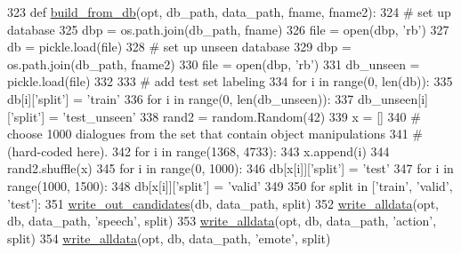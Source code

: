 \begin{DoxyCode}
323 \textcolor{keyword}{def }\hyperlink{namespaceparlai_1_1tasks_1_1light__dialog_1_1builder_a6a049254e487c29d008f875476ffd76f}{build\_from\_db}(opt, db\_path, data\_path, fname, fname2):
324     \textcolor{comment}{# set up database}
325     dbp = os.path.join(db\_path, fname)
326     file = open(dbp, \textcolor{stringliteral}{'rb'})
327     db = pickle.load(file)
328     \textcolor{comment}{# set up unseen database}
329     dbp = os.path.join(db\_path, fname2)
330     file = open(dbp, \textcolor{stringliteral}{'rb'})
331     db\_unseen = pickle.load(file)
332 
333     \textcolor{comment}{# add test set labeling}
334     \textcolor{keywordflow}{for} i \textcolor{keywordflow}{in} range(0, len(db)):
335         db[i][\textcolor{stringliteral}{'split'}] = \textcolor{stringliteral}{'train'}
336     \textcolor{keywordflow}{for} i \textcolor{keywordflow}{in} range(0, len(db\_unseen)):
337         db\_unseen[i][\textcolor{stringliteral}{'split'}] = \textcolor{stringliteral}{'test\_unseen'}
338     rand2 = random.Random(42)
339     x = []
340     \textcolor{comment}{# choose 1000 dialogues from the set that contain object manipulations}
341     \textcolor{comment}{# (hard-coded here).}
342     \textcolor{keywordflow}{for} i \textcolor{keywordflow}{in} range(1368, 4733):
343         x.append(i)
344     rand2.shuffle(x)
345     \textcolor{keywordflow}{for} i \textcolor{keywordflow}{in} range(0, 1000):
346         db[x[i]][\textcolor{stringliteral}{'split'}] = \textcolor{stringliteral}{'test'}
347     \textcolor{keywordflow}{for} i \textcolor{keywordflow}{in} range(1000, 1500):
348         db[x[i]][\textcolor{stringliteral}{'split'}] = \textcolor{stringliteral}{'valid'}
349 
350     \textcolor{keywordflow}{for} split \textcolor{keywordflow}{in} [\textcolor{stringliteral}{'train'}, \textcolor{stringliteral}{'valid'}, \textcolor{stringliteral}{'test'}]:
351         \hyperlink{namespaceparlai_1_1tasks_1_1light__dialog_1_1builder_a25aca9f28e4406290624e1d0c5cce0d6}{write\_out\_candidates}(db, data\_path, split)
352         \hyperlink{namespaceparlai_1_1tasks_1_1light__dialog_1_1builder_aeb144d0ebd2fd1727f73677e36f2c8b5}{write\_alldata}(opt, db, data\_path, \textcolor{stringliteral}{'speech'}, split)
353         \hyperlink{namespaceparlai_1_1tasks_1_1light__dialog_1_1builder_aeb144d0ebd2fd1727f73677e36f2c8b5}{write\_alldata}(opt, db, data\_path, \textcolor{stringliteral}{'action'}, split)
354         \hyperlink{namespaceparlai_1_1tasks_1_1light__dialog_1_1builder_aeb144d0ebd2fd1727f73677e36f2c8b5}{write\_alldata}(opt, db, data\_path, \textcolor{stringliteral}{'emote'}, split)

\end{DoxyCode}
